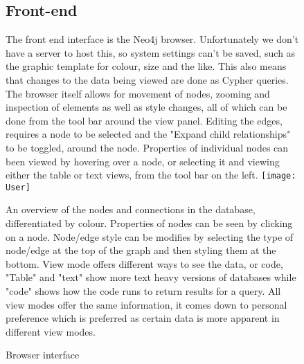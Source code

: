 \documentclass[11pt]{article}
\begin{document}
\begin{figure}
\subsection{Front-end}
The front end interface is the Neo4j browser. Unfortunately we don't have a server to host this, so system settings can't be saved, such as the graphic template for colour, size and the like. This also means that changes to the data being viewed are done as Cypher queries. The browser itself allows for movement of nodes, zooming and inspection of elements as well as style changes, all of which can be done from the tool bar around the view panel. Editing the edges, requires a node to be selected and the "Expand child relationships" to be toggled, around the node. Properties of individual nodes can been viewed by hovering over a node, or selecting it and viewing either the table or text views, from the tool bar on the left.\newline
\newline
\texttt{[image: User]}
\caption{Browser interface} 
\label{fig: 5}
An overview of the nodes and connections in the database, differentiated by colour. Properties of nodes can be seen by clicking on a node. Node/edge style can be modifies by selecting the type of node/edge at the top of the graph and then styling them at the bottom.\newline
View mode offers different ways to see the data, or code, "Table" and "text" show more text heavy versions of databases while "code" shows how the code runs to return results for a query. All view modes offer the same information, it comes down to personal preference which is preferred as certain data is more apparent in different view modes.\newline

\end{figure}
\end{document}
